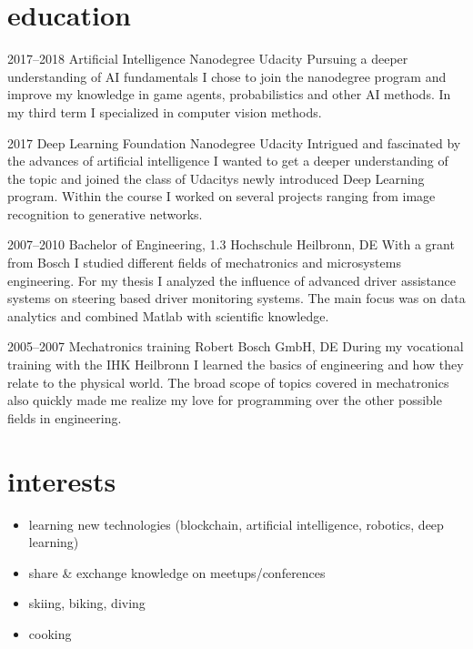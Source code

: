 \documentclass[]{friggeri-cv} %
\begin{document}
\section{\color{blue}education}

\begin{entrylist}

\entry
{2017--2018}
{Artificial Intelligence {\normalfont Nanodegree}}
{Udacity}
{Pursuing a deeper understanding of AI fundamentals I chose to join the nanodegree program and improve my knowledge in game agents, probabilistics and other AI methods. In my third term I specialized in computer vision methods.}

\entry
{2017}
{Deep Learning {\normalfont Foundation Nanodegree}}
{Udacity}
{Intrigued and fascinated by the advances of artificial intelligence I wanted to get a deeper understanding of the topic and joined the class of Udacitys newly introduced Deep Learning program. Within the course I worked on several projects ranging from image recognition to generative networks.}

\entry
{2007--2010}
{Bachelor {\normalfont of Engineering,} 1.3}
{Hochschule Heilbronn, DE}
{With a grant from Bosch I studied different fields of mechatronics and microsystems engineering. For my thesis I analyzed the influence of advanced driver assistance systems on steering based driver monitoring systems. The main focus was on data analytics and combined Matlab with scientific knowledge.
}

\entry
{2005--2007}
{Mechatronics training}
{Robert Bosch GmbH, DE}
{During my vocational training with the IHK Heilbronn I learned the basics of engineering and how they relate to the physical world. The broad scope of topics covered in mechatronics also quickly made me realize my love for programming over the other possible fields in engineering.
}
\end{entrylist}


\section{\color{green}interests}
\begin{itemize}
\item learning new technologies (blockchain, artificial intelligence, robotics, deep learning)
\item share \& exchange knowledge on meetups/conferences
\item skiing, biking, diving
\item cooking
\end{itemize}
\end{document}
